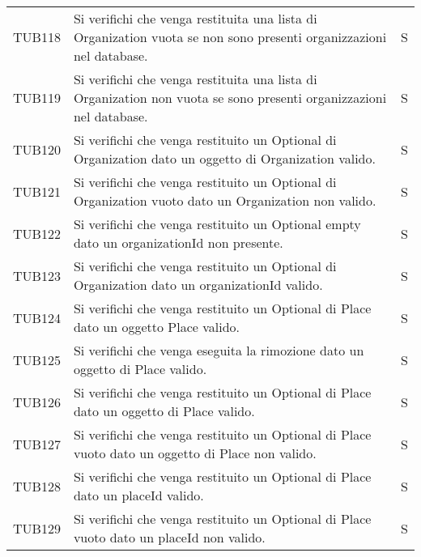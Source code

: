 {\begin{longtable}{ c C{13cm} C{1cm}}
TUB118 & Si verifichi che venga restituita una lista di Organization vuota se non sono presenti organizzazioni nel database. & S \\
TUB119 & Si verifichi che venga restituita una lista di Organization non vuota se sono presenti organizzazioni nel database. & S \\
TUB120 & Si verifichi che venga restituito un Optional di Organization dato un oggetto di Organization valido. & S \\
TUB121 & Si verifichi che venga restituito un Optional di Organization vuoto dato un Organization non valido. & S \\
TUB122 & Si verifichi che venga restituito un Optional empty dato un organizationId non presente. & S \\
TUB123 & Si verifichi che venga restituito un Optional di Organization dato un organizationId valido. & S \\
TUB124 & Si verifichi che venga restituito un Optional di Place dato un oggetto Place valido. & S \\
TUB125 & Si verifichi che venga eseguita la rimozione dato un oggetto di Place valido. & S \\
TUB126 & Si verifichi che venga restituito un Optional di Place dato un oggetto di Place valido. & S \\
TUB127 & Si verifichi che venga restituito un Optional di Place vuoto dato un oggetto di Place non valido. & S \\
TUB128 & Si verifichi che venga restituito un Optional di Place dato un placeId valido. & S \\
TUB129 & Si verifichi che venga restituito un Optional di Place vuoto dato un placeId non valido. & S \\
\end{longtable}
}